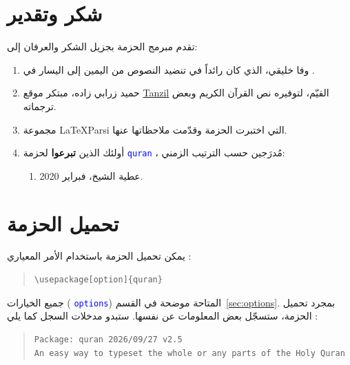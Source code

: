 \documentclass[12pt,a4paper]{article}
\let\XeTeX\relax
\begin{document}
\newpage 
\tableofcontents

\pagebreak

\section*{شكر وتقدير}

تقدم مبرمج الحزمة بجزيل الشكر والعرفان إلى:
\begin{enumerate}
    \parskip=0pt
    \item وفا خليقي، الذي كان رائداً في تنضيد النصوص من اليمين إلى اليسار في \XeTeX{}.
    \item حميد زرابي زاده، مبتكر موقع \href{https://tanzil.net}{Tanzil} القيّم،
    لتوفيره نص القرآن الكريم وبعض ترجماته.
    \item مجموعة 
    \LaTeX{}Parsi
     التي اختبرت الحزمة وقدّمت ملاحظاتها عنها.
    \item أولئك الذين \textbf{تبرعوا} لحزمة  \textcolor{blue}{\textenglish{\texttt{quran}}} ، مُدرَجين حسب الترتيب الزمني:
    \begin{enumerate}
        \item عطية الشيخ، فبراير 2020.
    \end{enumerate}
\end{enumerate}

\newpage


\section{تحميل الحزمة}


يمكن تحميل الحزمة باستخدام الأمر المعياري :

\begin{english}
\begin{quote}
\begin{lstlisting}[style=BashInputStyle]
\usepackage[option]{quran}
\end{lstlisting}
\end{quote}
\end{english}

جميع الخيارات 
( \textcolor{blue}{\texttt{options}})
 المتاحة موضحة في القسم~\ref{sec:options}.
بمجرد تحميل الحزمة، ستسجّل بعض المعلومات عن نفسها.
ستبدو مدخلات السجل كما يلي :

\begin{english}
\begin{quote}
\begin{lstlisting}[style=BashInputStyle]
Package: quran 2026/09/27 v2.5
An easy way to typeset the whole or any parts of the Holy Quran
\end{lstlisting}
\end{quote}
\end{english}
\end{document}
